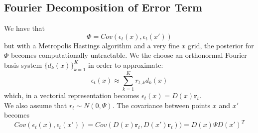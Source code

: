 \subsection{Fourier Decomposition of Error Term}
We have that 
\begin{equation}
    \Phi = Cov(\epsilon_t(x), \epsilon_t(x'))
\end{equation}
but with a Metropolis Hastings algorithm and a very fine $x$ grid, the posterior for $\Phi$ becomes computationally untractable. We the choose an orthonormal Fourier basis system $\{d_k(x)\}_{k=1}^K$ in order to approximate:
\begin{equation}
    \epsilon_t(x) \approx \sum_{k=1}^K r_{t, k}d_k(x)
\end{equation}
which, in a vectorial representation becomes $\epsilon_t(x) = D(x)\textbf{r}_t$. \\
We also assume that $r_t \sim N(0, \Psi)$. The covariance between points $x$ and $x'$ becomes
\begin{equation}
    Cov(\epsilon_t(x), \epsilon_t(x')) = Cov(D(x)\textbf{r}_t, D(x')\textbf{r}_t)) = D(x) \Psi D(x')^T
\end{equation}


